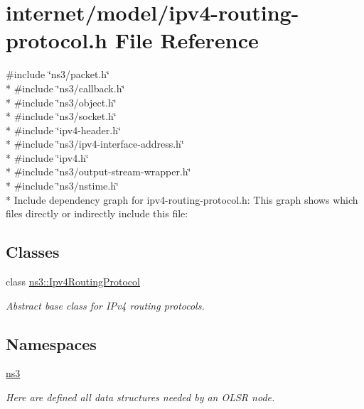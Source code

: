 \hypertarget{ipv4-routing-protocol_8h}{}\section{internet/model/ipv4-\/routing-\/protocol.h File Reference}
\label{ipv4-routing-protocol_8h}
{\ttfamily \#include \char`\"{}ns3/packet.\+h\char`\"{}}\\*
{\ttfamily \#include \char`\"{}ns3/callback.\+h\char`\"{}}\\*
{\ttfamily \#include \char`\"{}ns3/object.\+h\char`\"{}}\\*
{\ttfamily \#include \char`\"{}ns3/socket.\+h\char`\"{}}\\*
{\ttfamily \#include \char`\"{}ipv4-\/header.\+h\char`\"{}}\\*
{\ttfamily \#include \char`\"{}ns3/ipv4-\/interface-\/address.\+h\char`\"{}}\\*
{\ttfamily \#include \char`\"{}ipv4.\+h\char`\"{}}\\*
{\ttfamily \#include \char`\"{}ns3/output-\/stream-\/wrapper.\+h\char`\"{}}\\*
{\ttfamily \#include \char`\"{}ns3/nstime.\+h\char`\"{}}\\*
Include dependency graph for ipv4-\/routing-\/protocol.h\+:
This graph shows which files directly or indirectly include this file\+:
\subsection*{Classes}
\begin{DoxyCompactItemize}
\item 
class \hyperlink{classns3_1_1Ipv4RoutingProtocol}{ns3\+::\+Ipv4\+Routing\+Protocol}
\begin{DoxyCompactList}\small\item\em Abstract base class for I\+Pv4 routing protocols. \end{DoxyCompactList}\end{DoxyCompactItemize}
\subsection*{Namespaces}
\begin{DoxyCompactItemize}
\item 
 \hyperlink{namespacens3}{ns3}
\begin{DoxyCompactList}\small\item\em Here are defined all data structures needed by an O\+L\+SR node. \end{DoxyCompactList}\end{DoxyCompactItemize}
